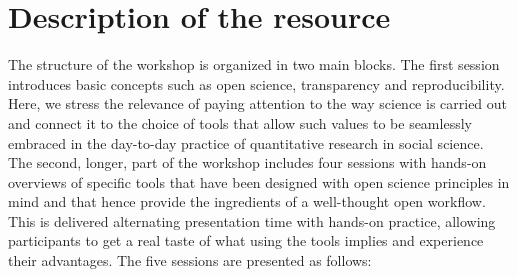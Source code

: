 \documentclass[11pt, a4paper]{article}
\begin{document}
\section{Description of the resource}
\label{sec-2}

The structure of the workshop is organized in two main blocks. The first
session introduces basic concepts such as open science, transparency and
reproducibility. Here, we stress the relevance of paying attention to the way
science is carried out and connect it to the choice of tools that allow such
values to be seamlessly embraced in the day-to-day practice of quantitative
research in social science. The second, longer, part of the workshop includes
four sessions with hands-on overviews of specific tools that have been
designed with open science principles in mind and that hence provide the
ingredients of a well-thought open workflow. This is delivered alternating
presentation time with hands-on practice, allowing participants to get a real taste of
what using the tools implies and experience their advantages. 
%
The five sessions are presented as follows:
\end{document}
